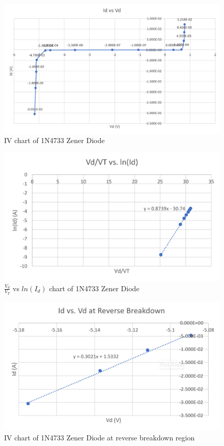 \documentclass{article}
\begin{document}
\begin{figure}[H]
  \centering
  \includegraphics[width=\textwidth]{ECE2200L_Lab4_IV.png}
  \caption{IV chart of 1N4733 Zener Diode}
  \label{fig:IV}
\end{figure}
\begin{figure}[H]
  \centering
  \includegraphics[width=\textwidth]{ECE2200L_Lab4_log.png}
  \caption{$\frac{V_d}{V_T}$ vs $ln(I_d)$ chart of 1N4733 Zener Diode}
  \label{fig:log}
\end{figure}
\begin{figure}[H]
  \centering
  \includegraphics[width=\textwidth]{ECE2200L_Lab4_IV_Breakdown.png}
  \caption{IV chart of 1N4733 Zener Diode at reverse breakdown region}
  \label{fig:breakdown}
\end{figure}
\end{document}
